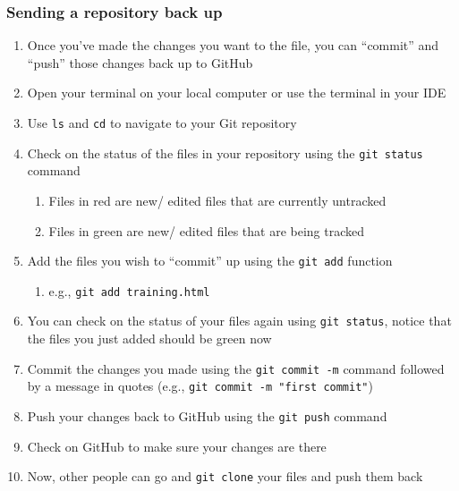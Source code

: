 \documentclass[
  letterpaper,
  DIV=11,
  numbers=noendperiod]{scrartcl}
\providecommand{\tightlist}{%
  \setlength{\itemsep}{0pt}\setlength{\parskip}{0pt}}\usepackage{longtable,booktabs,array}
\begin{document}
\hypertarget{sending-a-repository-back-up}{%
\subsubsection{Sending a repository back
up}\label{sending-a-repository-back-up}}

\begin{enumerate}
\def\labelenumi{\arabic{enumi}.}
\tightlist
\item
  Once you've made the changes you want to the file, you can ``commit''
  and ``push'' those changes back up to GitHub
\item
  Open your terminal on your local computer or use the terminal in your
  IDE
\item
  Use \texttt{ls} and \texttt{cd} to navigate to your Git repository
\item
  Check on the status of the files in your repository using the
  \texttt{git\ status} command

  \begin{enumerate}
  \def\labelenumii{\arabic{enumii}.}
  \tightlist
  \item
    Files in red are new/ edited files that are currently untracked
  \item
    Files in green are new/ edited files that are being tracked
  \end{enumerate}
\item
  Add the files you wish to ``commit'' up using the \texttt{git\ add}
  function

  \begin{enumerate}
  \def\labelenumii{\arabic{enumii}.}
  \tightlist
  \item
    e.g., \texttt{git\ add\ training.html}
  \end{enumerate}
\item
  You can check on the status of your files again using
  \texttt{git\ status}, notice that the files you just added should be
  green now
\item
  Commit the changes you made using the \texttt{git\ commit\ -m} command
  followed by a message in quotes (e.g.,
  \texttt{git\ commit\ -m\ "first\ commit"})
\item
  Push your changes back to GitHub using the \texttt{git\ push} command
\item
  Check on GitHub to make sure your changes are there
\item
  Now, other people can go and \texttt{git\ clone} your files and push
  them back
\end{enumerate}
\end{document}
